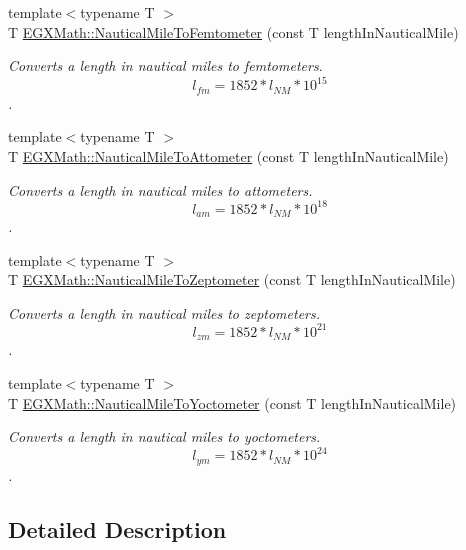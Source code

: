 \begin{DoxyCompactItemize}
{\footnotesize template$<$typename T $>$ }\\T \mbox{\hyperlink{group___e_g_x_math-_conversions-_length_conversions-_nautical-_nautical_mile-_s_i_gacb38ddd47f497e26e3f0dcc8d32cca85}{E\+G\+X\+Math\+::\+Nautical\+Mile\+To\+Femtometer}} (const T length\+In\+Nautical\+Mile)
\begin{DoxyCompactList}\small\item\em Converts a length in nautical miles to femtometers. \[ l_{fm}=1852 * l_{NM} * 10^{15} \]. \end{DoxyCompactList}\item 
{\footnotesize template$<$typename T $>$ }\\T \mbox{\hyperlink{group___e_g_x_math-_conversions-_length_conversions-_nautical-_nautical_mile-_s_i_ga18a7668c4fb069dd5955fd010bff4db5}{E\+G\+X\+Math\+::\+Nautical\+Mile\+To\+Attometer}} (const T length\+In\+Nautical\+Mile)
\begin{DoxyCompactList}\small\item\em Converts a length in nautical miles to attometers. \[ l_{am}=1852 * l_{NM} * 10^{18} \]. \end{DoxyCompactList}\item 
{\footnotesize template$<$typename T $>$ }\\T \mbox{\hyperlink{group___e_g_x_math-_conversions-_length_conversions-_nautical-_nautical_mile-_s_i_ga58ac712a2ae63b010c8480d380f2a7c6}{E\+G\+X\+Math\+::\+Nautical\+Mile\+To\+Zeptometer}} (const T length\+In\+Nautical\+Mile)
\begin{DoxyCompactList}\small\item\em Converts a length in nautical miles to zeptometers. \[ l_{zm}=1852 * l_{NM} * 10^{21} \]. \end{DoxyCompactList}\item 
{\footnotesize template$<$typename T $>$ }\\T \mbox{\hyperlink{group___e_g_x_math-_conversions-_length_conversions-_nautical-_nautical_mile-_s_i_ga88c9ac99418bf78c790532bd414d0a89}{E\+G\+X\+Math\+::\+Nautical\+Mile\+To\+Yoctometer}} (const T length\+In\+Nautical\+Mile)
\begin{DoxyCompactList}\small\item\em Converts a length in nautical miles to yoctometers. \[ l_{ym}=1852 * l_{NM} * 10^{24} \]. \end{DoxyCompactList}\end{DoxyCompactItemize}


\subsection{Detailed Description}


